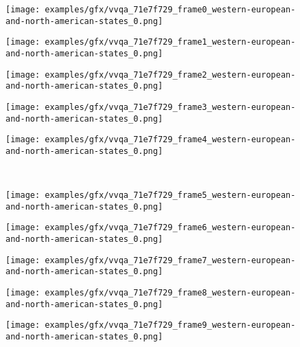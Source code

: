\begin{figure}[H]
\begin{tcolorbox}[colback=gray!5!white,colframe=black!75!black,fonttitle=\bfseries\scriptsize,fontupper=\ttfamily\footnotesize,segmentation style={solid, black!30}]
  \begin{center}
    \begin{minipage}{0.18\linewidth}
      \centering
      \texttt{[image: examples/gfx/vvqa\_71e7f729\_frame0\_western-european-and-north-american-states\_0.png]}
    \end{minipage}\hfill
    \begin{minipage}{0.18\linewidth}
      \centering
      \texttt{[image: examples/gfx/vvqa\_71e7f729\_frame1\_western-european-and-north-american-states\_0.png]}
    \end{minipage}\hfill
    \begin{minipage}{0.18\linewidth}
      \centering
      \texttt{[image: examples/gfx/vvqa\_71e7f729\_frame2\_western-european-and-north-american-states\_0.png]}
    \end{minipage}\hfill
    \begin{minipage}{0.18\linewidth}
      \centering
      \texttt{[image: examples/gfx/vvqa\_71e7f729\_frame3\_western-european-and-north-american-states\_0.png]}
    \end{minipage}\hfill
    \begin{minipage}{0.18\linewidth}
      \centering
      \texttt{[image: examples/gfx/vvqa\_71e7f729\_frame4\_western-european-and-north-american-states\_0.png]}
    \end{minipage}\hfill
  \\[4mm]
    \begin{minipage}{0.18\linewidth}
      \centering
      \texttt{[image: examples/gfx/vvqa\_71e7f729\_frame5\_western-european-and-north-american-states\_0.png]}
    \end{minipage}\hfill
    \begin{minipage}{0.18\linewidth}
      \centering
      \texttt{[image: examples/gfx/vvqa\_71e7f729\_frame6\_western-european-and-north-american-states\_0.png]}
    \end{minipage}\hfill
    \begin{minipage}{0.18\linewidth}
      \centering
      \texttt{[image: examples/gfx/vvqa\_71e7f729\_frame7\_western-european-and-north-american-states\_0.png]}
    \end{minipage}\hfill
    \begin{minipage}{0.18\linewidth}
      \centering
      \texttt{[image: examples/gfx/vvqa\_71e7f729\_frame8\_western-european-and-north-american-states\_0.png]}
    \end{minipage}\hfill
    \begin{minipage}{0.18\linewidth}
      \centering
      \texttt{[image: examples/gfx/vvqa\_71e7f729\_frame9\_western-european-and-north-american-states\_0.png]}
    \end{minipage}\hfill
  \end{center}


\end{tcolorbox}
\end{figure}
